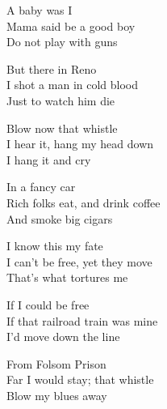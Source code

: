 \documentclass[12pt]{article}
\begin{document}
A baby was I \\
Mama said be a good boy \\
Do not play with guns 
                                                                                                                          
But there in Reno \\ 
I shot a man in cold blood \\
Just to watch him die  

Blow now that whistle \\
I hear it, hang my head down \\
I hang it and cry 

\newpage

In a fancy car  \\ 
Rich folks eat, and drink coffee \\
And smoke big cigars 
                                                                                                                          
I know this my fate \\
I can't be free, yet they move \\
That's what tortures me         
                                                                                                                          
If I could be free \\ 
If that railroad train was mine \\ 
I'd move down the line                                                                                                    
                                                                                                                          
From Folsom Prison \\
Far I would stay; that whistle \\
Blow my blues away

\newpage
\end{document}
